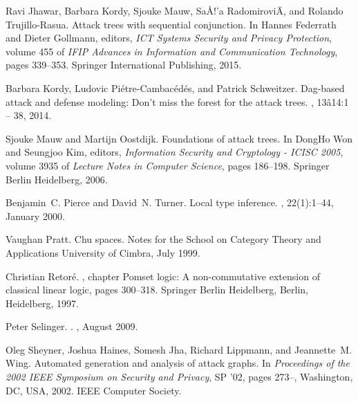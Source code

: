 \documentclass{sigplanconf}
\begin{document}
\begin{thebibliography}{10}
  Ravi Jhawar, Barbara Kordy, Sjouke Mauw, Sa{\AA}{!'}a Radomirovi{\"A}, and
  Rolando Trujillo-Rasua.
  \newblock Attack trees with sequential conjunction.
  \newblock In Hannes Federrath and Dieter Gollmann, editors, {\em ICT Systems
    Security and Privacy Protection}, volume 455 of {\em IFIP Advances in
    Information and Communication Technology}, pages 339--353. Springer
  International Publishing, 2015.

  Barbara Kordy, Ludovic Pi{\'e}tre-Cambac{\'e}d{\'e}s, and Patrick Schweitzer.
  \newblock Dag-based attack and defense modeling: Don't miss the forest for the
  attack trees.
  , 13{\^a}14:1 -- 38, 2014.

  Sjouke Mauw and Martijn Oostdijk.
  \newblock Foundations of attack trees.
  \newblock In DongHo Won and Seungjoo Kim, editors, {\em Information Security
    and Cryptology - ICISC 2005}, volume 3935 of {\em Lecture Notes in Computer
    Science}, pages 186--198. Springer Berlin Heidelberg, 2006.

  Benjamin~C. Pierce and David~N. Turner.
  \newblock Local type inference.
  , 22(1):1--44, January 2000.

  Vaughan Pratt.
  \newblock Chu spaces.
  \newblock Notes for the School on Category Theory and Applications University
  of Cimbra, July 1999.

  Christian Retor{\'e}.
  , chapter Pomset logic: A non-commutative
  extension of classical linear logic, pages 300--318.
  \newblock Springer Berlin Heidelberg, Berlin, Heidelberg, 1997.

  Peter {Selinger}.
  .
  , August 2009.

  Oleg Sheyner, Joshua Haines, Somesh Jha, Richard Lippmann, and Jeannette~M.
  Wing.
  \newblock Automated generation and analysis of attack graphs.
  \newblock In {\em Proceedings of the 2002 IEEE Symposium on Security and
    Privacy}, SP '02, pages 273--, Washington, DC, USA, 2002. IEEE Computer
  Society.


\end{thebibliography}
\end{document}

